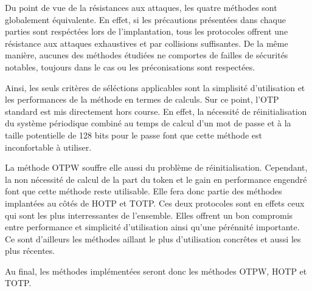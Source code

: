 \documentclass{../res/univ-projet}
\begin{document}
Du point de vue de la résistances aux attaques, les quatre méthodes sont globalement équivalente. En effet, si les 
précautions présentées dans chaque parties sont respéctées lors de l'implantation, tous les protocoles offrent une
résistance aux attaques exhaustives et par collisions suffisantes. De la même manière, aucunes des méthodes étudiées 
ne comportes de failles de sécurités notables, toujours dans le cas ou les préconisations sont respectées.

Ainsi, les seuls critères de séléctions applicables sont la simplisité d'utilisation et les performances de la méthode
en termes de calculs. Sur ce point, l'OTP standard est mis directement hors course. En effet, la nécessité de 
réinitialisation du système périodique combiné au temps de calcul d'un mot de passe et à la taille potentielle de 
128 bits pour le passe font que cette méthode est inconfortable à utiliser.

La méthode OTPW souffre elle aussi du problème de réinitialisation. Cependant, la non nécessité de calcul de la part du 
token et le gain en performance engendré font que cette méthode reste utilisable. Elle fera donc partie des méthodes
implantées au côtés de HOTP et TOTP. Ces deux protocoles sont en effets ceux qui sont les plus interressantes de l'ensemble.
Elles offrent un bon compromis entre performance et simplicité d'utilisation ainsi qu'une pérénnité importante. Ce sont 
d'ailleurs les méthodes aillant le plus d'utilisation concrêtes et aussi les plus récentes.

Au final, les méthodes implémentées seront donc les méthodes OTPW, HOTP et TOTP.
  
\end{document}
